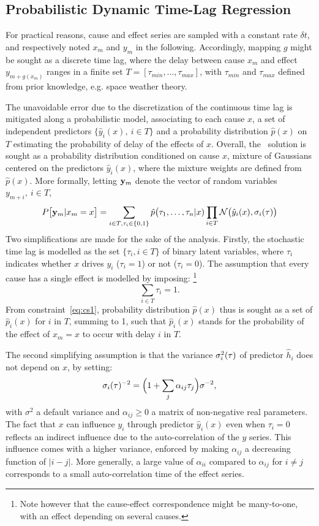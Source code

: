 \subsection{Probabilistic Dynamic Time-Lag Regression}

For practical reasons, cause and effect series are sampled with a constant rate $\delta t$, and 
respectively noted ${x_m}$ and ${y_m}$ in the following. Accordingly, mapping $g$ might be sought 
as a discrete time lag, where the delay between cause $x_m$ and effect $y_{m+g(x_m)}$ ranges in a 
finite set $T = [\tau_{min}, \ldots, \tau_{max}]$, with  $\tau_{min}$ and  $\tau_{max}$ defined 
from prior knowledge, e.g. space weather theory. 

The unavoidable error due to the discretization of the continuous time lag is mitigated along a 
probabilistic model, associating to each cause $x$, a set of independent predictors 
$\{\hat y_i(x),\ i \in T\}$ and a probability distribution $\hat p(x)$ on $T$ estimating the 
probability of delay of the effects of $x$. Overall, the \XX\ solution is sought as a probability 
distribution conditioned on cause $x$, mixture of Gaussians centered on the predictors 
$\hat y_i(x)$, where the mixture weights are defined from $\hat p(x)$. More formally, letting 
${\bf y}_m$ denote the vector of random variables $y_{m+i},\ i \in T$, 
%
\begin{equation}\label{eq:py}
  P\bigl[{\bf y}_{m}\vert x_m=x\bigr] = 
  \sum_{i \in T, \tau_i\in\{0,1\}} \hat p\bigl(\tau_1,\ldots,\tau_n\vert x) 
  \prod_{i\in T} {\cal N}\bigl(\hat y_i(x),\sigma_i(\tau)\bigr)
\end{equation}
%
Two simplifications are made for the sake of the analysis. Firstly, the stochastic time lag is 
modelled as the set $\{\tau_i, i \in T\}$ of binary latent variables, where $\tau_i$ indicates 
whether $x$ drives $y_i$ ($\tau_i=1$) or not ($\tau_i=0$). The assumption that every cause has a 
single effect is modelled by imposing: \footnote{Note however that the cause-effect correspondence 
might be many-to-one, with an effect depending on several causes.}
%
\begin{equation}\label{eq:cs1}
\sum_{i \in T} \tau_i = 1.
\end{equation}
%
From constraint~\cref{eq:cs1}, probability distribution $\hat p(x)$ thus is sought as a set of 
$\hat p_i(x)$ for $i$ in $T$, summing to 1, such that $\hat p_i(x)$ stands for the probability of 
the effect of $x_m=x$ to occur with delay $i$ in $T$.

The second simplifying assumption is that the variance $\sigma_i^2({\bf \tau})$ of predictor 
$\hat h_i$ does not depend on $x$, by setting:
\[
\sigma_i({\bf \tau})^{-2} = \Bigl(1+\sum_j\alpha_{ij} \tau_j\Bigr)\sigma^{-2},
\]
with $\sigma^2$ a default variance and $\alpha_{ij}\ge 0$ a matrix of non-negative real parameters. 
The fact that $x$ can influence $y_i$ through predictor $\hat y_i(x)$ even when $\tau_i=0$ reflects 
an indirect influence due to the auto-correlation of the $y$ series. This influence comes with a 
higher variance, enforced by making $\alpha_{ij}$ a decreasing function of $\vert i-j\vert$. More 
generally, a large value of $\alpha_{ii}$ compared to $\alpha_{ij}$ for $i\ne j$ corresponds to a 
small auto-correlation time of the effect series. 

